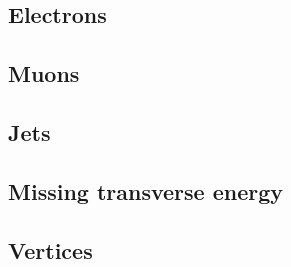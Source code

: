 
\subsection{Electrons}

\subsection{Muons}

\subsection{Jets}

\subsection{Missing transverse energy}

\subsection{Vertices}
